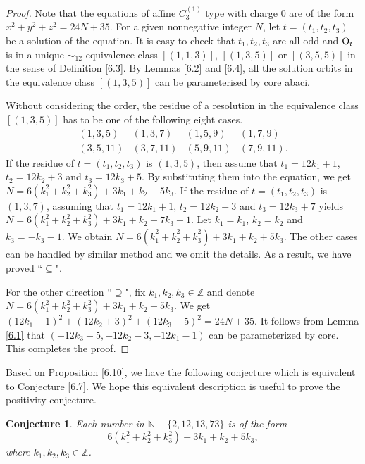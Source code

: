 \documentclass[11pt]{amsart}
\theoremstyle{plain}
\numberwithin{equation}{subsection}
\newtheorem{conjecture}[theorem]{Conjecture}
\begin{document}
\begin{proof}
Note that the equations of affine $C_3^{(1)}$ type with charge $0$ are of the form $x^2+y^2+z^2=24N+35$.
For a given nonnegative integer $N$, let $t=(t_1, t_2, t_3)$ be a solution of the equation.
It is easy to check that $t_1, t_2, t_3$ are all odd and ${\rm O}_{t}$ is in a unique $\sim_{12}$-equivalence class
$[(1, 1, 3)]$, $[(1, 3, 5)]$ or $[(3, 5, 5)]$ in the sense of Definition \ref{6.3}. By Lemmas \ref{6.2} and \ref{6.4}, all the solution orbits in 
the equivalence class $[(1, 3, 5)]$ can be parameterised by core abaci.

Without considering the order, the residue of a resolution in the equivalence class $[(1, 3, 5)]$ has to be one of the following eight cases.
$$\begin{array}{cccc}
    (1, 3, 5) & (1, 3, 7) & (1, 5, 9) & (1, 7, 9) \\
    (3, 5, 11) & (3, 7, 11) & (5, 9, 11) & (7, 9, 11).
  \end{array}$$
If the residue of $t=(t_1, t_2, t_3)$ is $(1, 3, 5)$, then assume that $t_1=12k_1+1$, $t_2=12k_2+3$ and $t_3=12k_3+5$.
By substituting them into the equation, we get $N=6(k_1^2+k_2^2+k_3^2)+3k_1+k_2+5k_3$.
If the residue of $t=(t_1, t_2, t_3)$ is $(1, 3, 7)$, assuming that $t_1=12k_1+1$, $t_2=12k_2+3$ and $t_3=12k_3+7$
yields $N=6(k_1^2+k_2^2+k_3^2)+3k_1+k_2+7k_3+1$. Let $\overline{k}_1=k_1$, $\overline{k}_2=k_2$ and $\overline{k}_3=-k_3-1$.
We obtain $N=6(\bar{k}_1^2+\bar{k}_2^2+\bar{k}_3^2)+3\overline{k}_1+\overline{k}_2+5\overline{k}_3$.
The other cases can be handled by similar method and we omit the details. As a result, we have proved ``$\subseteq$".

For the other direction ``$\supseteq$", fix $k_1, k_2, k_3\in \mathbb{Z}$ and denote $N=6(k_1^2+k_2^2+k_3^2)+3k_1+k_2+5k_3$.
We get $(12k_1+1)^2+(12k_2+3)^2+(12k_3+5)^2=24N+35$. It follows from Lemma \ref{6.1} that $(-12k_3-5, -12k_2-3, -12k_1-1)$
can be parameterized by core. This completes the proof.
\end{proof}

Based on Proposition \ref{6.10}, we have the following conjecture which is equivalent to Conjecture \ref{6.7}. 
We hope this equivalent description is useful to prove the positivity conjecture.

\begin{conjecture}\label{6.11}
Each number in $\mathbb{N}-\{2, 12, 13, 73\}$ is of the form $$6(k_1^2+k_2^2+k_3^2)+3k_1+k_2+5k_3,$$ where $k_1, k_2, k_3\in\mathbb{Z}$.
\end{conjecture}
\end{document}
